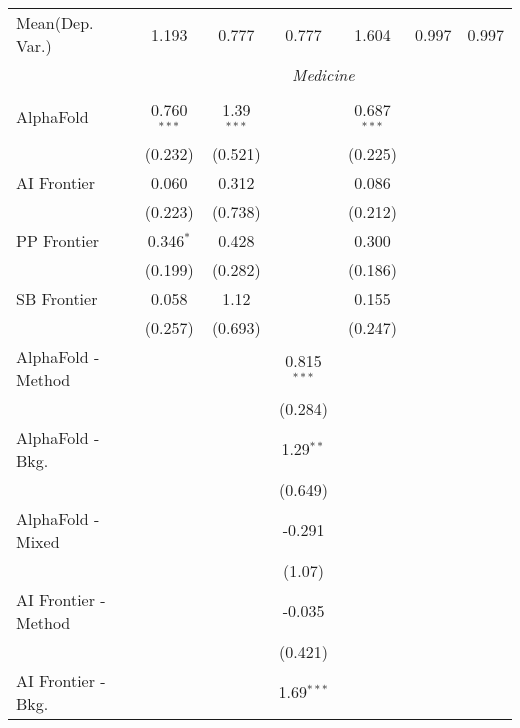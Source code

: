 \begin{tabular}{lcccccc}
Mean(Dep. Var.) & 1.193 & 0.777 & 0.777 & 1.604 & 0.997 & 0.997 \\
 & \multicolumn{6}{c}{\textit{Medicine}} \\ \\
   AlphaFold            & 0.760$^{***}$ & 1.39$^{***}$ &               & 0.687$^{***}$ &        &   \\   
                        & (0.232)       & (0.521)      &               & (0.225)       &        &   \\   
   AI Frontier          & 0.060         & 0.312        &               & 0.086         &        &   \\   
                        & (0.223)       & (0.738)      &               & (0.212)       &        &   \\   
   PP Frontier          & 0.346$^{*}$   & 0.428        &               & 0.300         &        &   \\   
                        & (0.199)       & (0.282)      &               & (0.186)       &        &   \\   
   SB Frontier          & 0.058         & 1.12         &               & 0.155         &        &   \\   
                        & (0.257)       & (0.693)      &               & (0.247)       &        &   \\   
   AlphaFold - Method   &               &              & 0.815$^{***}$ &               &        &   \\   
                        &               &              & (0.284)       &               &        &   \\   
   AlphaFold - Bkg.     &               &              & 1.29$^{**}$   &               &        &   \\   
                        &               &              & (0.649)       &               &        &   \\   
   AlphaFold - Mixed    &               &              & -0.291        &               &        &   \\   
                        &               &              & (1.07)        &               &        &   \\   
   AI Frontier - Method &               &              & -0.035        &               &        &   \\   
                        &               &              & (0.421)       &               &        &   \\   
   AI Frontier - Bkg.   &               &              & 1.69$^{***}$  &               &        &   \\   

\end{tabular}
